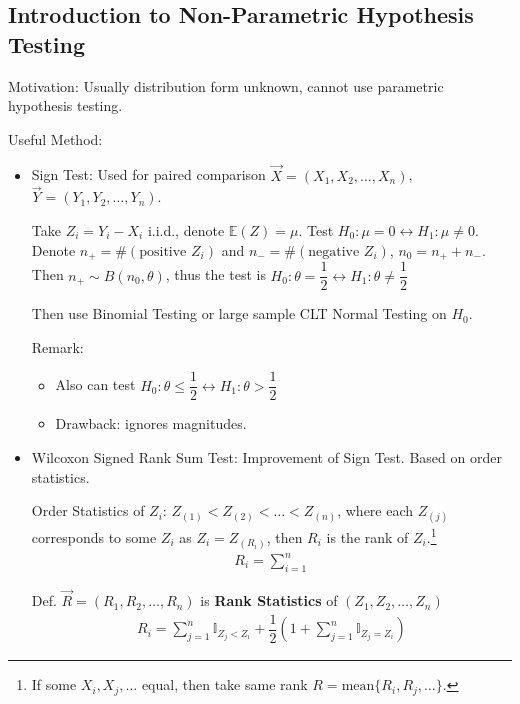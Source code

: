 \subsection{Introduction to Non-Parametric Hypothesis Testing}\label{SubSectionIntroToNonParametricHypothesisTesting}

    Motivation: Usually distribution form unknown, cannot use parametric hypothesis testing.

    Useful Method:
    \begin{itemize}
        \item Sign Test: Used for paired comparison $\vec{X}=(X_1,X_2,\ldots,X_n)$, $\vec{Y}=(Y_1,Y_2,\ldots,Y_n)$.
        
        Take $Z_i=Y_i-X_i$ i.i.d., denote $\mathbb{E}(Z)=\mu$. Test $H_0:\mu=0\longleftrightarrow H_1:\mu\neq 0$. Denote $n_+=\#(\text{positive } Z_i)$ and $n_-=\#(\text{negative }Z_i)$, $n_0=n_++n_-$. Then $n_+\sim B(n_0,\theta)$, thus the test is $H_0:\theta=\dfrac{1}{2}\longleftrightarrow H_1:\theta\neq\dfrac{1}{2}$
        
        Then use Binomial Testing or large sample CLT Normal Testing on $ H_0 $.

        Remark:
        \begin{itemize}
            \item Also can test $H_0:\theta\leq\dfrac{1}{2}\longleftrightarrow H_1:\theta>\dfrac{1}{2}$
            \item Drawback: ignores magnitudes.
        \end{itemize}
        
        \item {}Wilcoxon Signed Rank Sum Test: Improvement of Sign Test. Based on order statistics.
        
        Order Statistics of $Z_i$: $Z_{(1)}<Z_{(2)}<\ldots<Z_{(n)}$, where each $Z_{(j)}$ corresponds to some $Z_i$ as $Z_i=Z_{(R_i)}$, then $R_i$ is the rank of $Z_i$.\footnote{If some $X_i,X_j,\ldots$ equal, then take same rank $R=\mathrm{mean}\{R_i,R_j,\ldots\}$.}
        \begin{align*}
            R_i=\sum_{i=1}^n 
        \end{align*}
        
        
        
        Def. $\vec{R}=(R_1,R_2,\ldots,R_n)$ is \textbf{Rank Statistics} of $(Z_1,Z_2,\ldots,Z_n)$
        \begin{align*}
            R_i=\sum_{j=1}^n\mathbb{I}_{Z_j<Z_i}+\dfrac{1}{2}\left(1+\sum_{j=1}^n\mathbb{I}_{Z_j=Z_i} \right)
        \end{align*}
        

\end{itemize}
